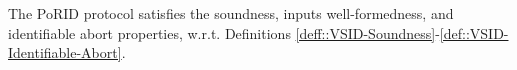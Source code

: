 \begin{theorem}
The PoRID protocol satisfies the soundness, inputs well-formedness, and identifiable abort properties, w.r.t. Definitions \ref{deff::VSID-Soundness}-\ref{def::VSID-Identifiable-Abort}.
\end{theorem}















